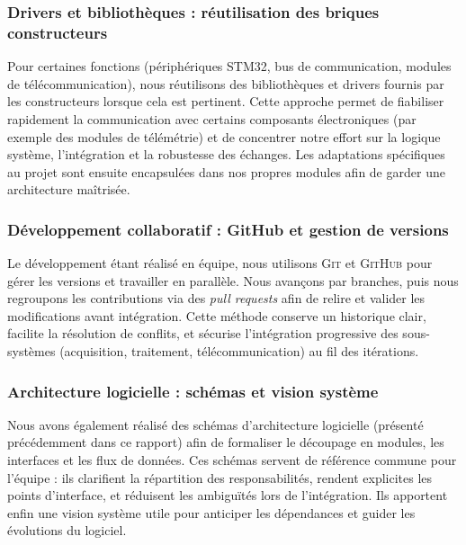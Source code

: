 \subsubsection{Drivers et bibliothèques : réutilisation des briques constructeurs}
Pour certaines fonctions (périphériques \textsc{STM32}, bus de communication, modules de télécommunication), nous réutilisons
des bibliothèques et drivers fournis par les constructeurs lorsque cela est pertinent. Cette approche permet de fiabiliser
rapidement la communication avec certains composants électroniques (par exemple des modules de télémétrie) et de concentrer
notre effort sur la logique système, l’intégration et la robustesse des échanges. Les adaptations spécifiques au projet sont
ensuite encapsulées dans nos propres modules afin de garder une architecture maîtrisée.

\subsubsection{Développement collaboratif : GitHub et gestion de versions}
Le développement étant réalisé en équipe, nous utilisons \textsc{Git} et \textsc{GitHub} pour gérer les versions et travailler
en parallèle. Nous avançons par branches, puis nous regroupons les contributions via des \textit{pull requests} afin de relire
et valider les modifications avant intégration. Cette méthode conserve un historique clair, facilite la résolution de conflits,
et sécurise l’intégration progressive des sous-systèmes (acquisition, traitement, télécommunication) au fil des itérations.

\subsubsection{Architecture logicielle : schémas et vision système}
Nous avons également réalisé des schémas d’architecture logicielle (présenté précédemment dans ce rapport) afin de formaliser le
découpage en modules, les interfaces et les flux de données. Ces schémas servent de référence commune pour l’équipe : ils
clarifient la répartition des responsabilités, rendent explicites les points d’interface, et réduisent les ambiguïtés lors de
l’intégration. Ils apportent enfin une vision système utile pour anticiper les dépendances et guider les évolutions du logiciel.

\newpage

